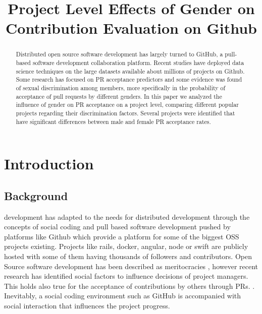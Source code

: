 


\title{Project Level Effects of Gender on Contribution Evaluation on Github}

\author{
	}

\maketitle

\begin{abstract}%

Distributed open source software development has largely turned to GitHub, a pull-based software development collaboration platform. Recent studies have deployed data science techniques on the large datasets available about millions of projects on Github. Some research has focused on \ac{PR} acceptance predictors and some evidence was found of sexual discrimination among members, more specifically in the probability of acceptance of pull requests by different genders. In this paper we analyzed the influence of gender on \ac{PR} acceptance on a project level, comparing different popular projects regarding their discrimination factors. Several projects were identified that have significant differences between male and female \ac{PR} acceptance rates.
\end{abstract}


\section{Introduction}\label{Introduction}

\subsection{Background}%
 development has adapted to the needs for distributed development through the concepts of social coding and pull based software development pushed by platforms like Github which provide a platform for some of the biggest \ac{OSS} projects existing. Projects like rails, docker, angular, node or swift are publicly hosted with some of them having thousands of followers and contributors. Open Source software development has been described as meritocracies \cite{Scacchi:2007:FSS:1295014.1295019}, however recent research has identified social factors to influence decisions of project managers. This holds also true for the acceptance of contributions by others through \ac{PR}s. \cite{Tsay:2014:IST:2568225.2568315}. Inevitably, a social coding environment such as GitHub is accompanied with social interaction that influences the project progress.

